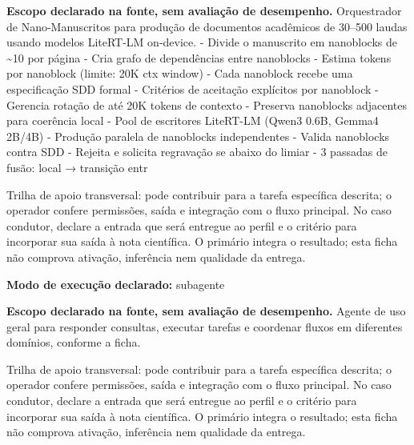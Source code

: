 
\begin{descricao}
\textbf{Escopo declarado na fonte, sem avaliação de desempenho.}
Orquestrador de Nano-Manuscritos para produção de documentos acadêmicos de 30–500 laudas usando modelos LiteRT-LM on-device. - Divide o manuscrito em nanoblocks de \~{}10 por página - Cria grafo de dependências entre nanoblocks - Estima tokens por nanoblock (limite: 20K ctx window) - Cada nanoblock recebe uma especificação SDD formal - Critérios de aceitação explícitos por nanoblock - Gerencia rotação de até 20K tokens de contexto - Preserva nanoblocks adjacentes para coerência local - Pool de escritores LiteRT-LM (Qwen3 0.6B, Gemma4 2B/4B) - Produção paralela de nanoblocks independentes - Valida nanoblocks contra SDD - Rejeita e solicita regravação se abaixo do limiar - 3 passadas de fusão: local → transição entr
\end{descricao}

\begin{funcao}
Trilha de apoio transversal: pode contribuir para a tarefa específica descrita; o operador confere permissões, saída e integração com o fluxo principal. No caso condutor, declare a entrada que será entregue ao perfil e o critério para incorporar sua saída à nota científica. O primário integra o resultado; esta ficha não comprova ativação, inferência nem qualidade da entrega.
\end{funcao}

\begin{arquitetura}
\textbf{Modo de execução declarado:} subagente
\end{arquitetura}


\begin{descricao}
\textbf{Escopo declarado na fonte, sem avaliação de desempenho.}
Agente de uso geral para responder consultas, executar tarefas e coordenar fluxos em diferentes domínios, conforme a ficha.
\end{descricao}

\begin{funcao}
Trilha de apoio transversal: pode contribuir para a tarefa específica descrita; o operador confere permissões, saída e integração com o fluxo principal. No caso condutor, declare a entrada que será entregue ao perfil e o critério para incorporar sua saída à nota científica. O primário integra o resultado; esta ficha não comprova ativação, inferência nem qualidade da entrega.
\end{funcao}


